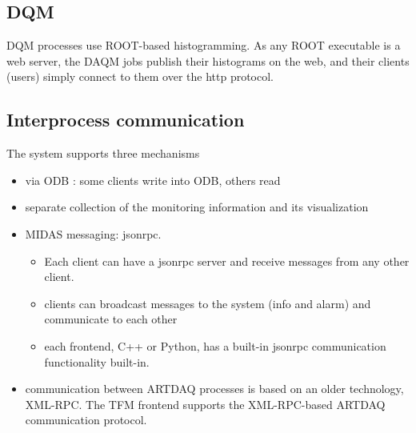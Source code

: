 \subsection{DQM}

DQM processes use ROOT-based histogramming. As any ROOT executable is a web server,
the DAQM jobs publish their histograms on the web, and their clients (users)
simply connect to them over the http protocol.

\subsection{Interprocess communication} 

The system supports three mechanisms
\begin{itemize}
\item
  via ODB : some clients write into ODB, others read
\item
  separate collection of the monitoring information and its visualization
\item
  MIDAS messaging: jsonrpc.
  \begin{itemize}
  \item
    Each client can have a jsonrpc server and receive messages
    from any other client.
  \item
    clients can broadcast messages to the system (info and alarm)
    and communicate to each other
  \item
    each frontend, C++ or Python, has a built-in jsonrpc communication
    functionality built-in.
  \end{itemize}
\item
  communication between ARTDAQ processes is based on an older technology,
  XML-RPC. The TFM frontend supports the XML-RPC-based ARTDAQ communication
  protocol.
\end{itemize}
